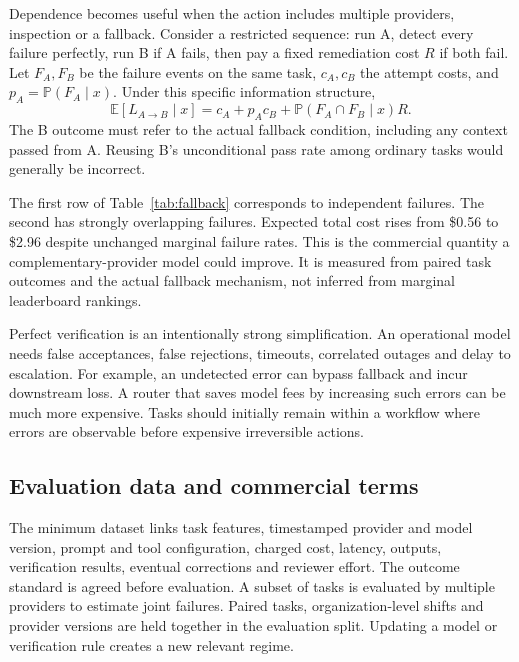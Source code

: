 \documentclass[11pt]{article}
\newcommand{\E}{\mathbb E}
\newcommand{\Prob}{\mathbb P}
\theoremstyle{remark}\newtheorem{example}{Example}
\begin{document}
Dependence becomes useful when the action includes multiple providers,
inspection or a fallback. Consider a restricted sequence: run A, detect every
failure perfectly, run B if A fails, then pay a fixed remediation cost $R$ if
both fail. Let $F_A,F_B$ be the failure events on the same task, $c_A,c_B$ the
attempt costs, and $p_A=\Prob(F_A\mid x)$. Under this specific information
structure,
\begin{equation}\label{eq:fallback}
 \E[L_{A\to B}\mid x]
 =c_A+p_Ac_B+\Prob(F_A\cap F_B\mid x)R.
\end{equation}
The B outcome must refer to the actual fallback condition, including any
context passed from A. Reusing B's unconditional pass rate among ordinary
tasks would generally be incorrect.

\begin{table}[htbp]\centering\small

\caption{Illustrative fallback economics with marginal failure probabilities
10\% for both providers, $c_A=\$0.20$, $c_B=\$0.60$ and $R=\$30$.
The two joint failure laws satisfy the same marginal rates.}\label{tab:fallback}
\end{table}

The first row of Table~\ref{tab:fallback} corresponds to independent failures.
The second has strongly overlapping failures. Expected total cost rises from
\$0.56 to \$2.96 despite unchanged marginal failure rates. This is the
commercial quantity a complementary-provider model could improve. It is
measured from paired task outcomes and the actual fallback mechanism, not
inferred from marginal leaderboard rankings.

Perfect verification is an intentionally strong simplification. An operational
model needs false acceptances, false rejections, timeouts, correlated outages
and delay to escalation. For example, an undetected error can bypass fallback
and incur downstream loss. A router that saves model fees by increasing such
errors can be much more expensive. Tasks should initially remain within a
workflow where errors are observable before expensive irreversible actions.

\subsection{Evaluation data and commercial terms}
The minimum dataset links task features, timestamped provider and model version,
prompt and tool configuration, charged cost, latency, outputs, verification
results, eventual corrections and reviewer effort. The outcome standard is
agreed before evaluation. A subset of tasks is evaluated by multiple providers
to estimate joint failures. Paired tasks, organization-level shifts and provider
versions are held together in the evaluation split. Updating a model or
verification rule creates a new relevant regime.
\end{document}
